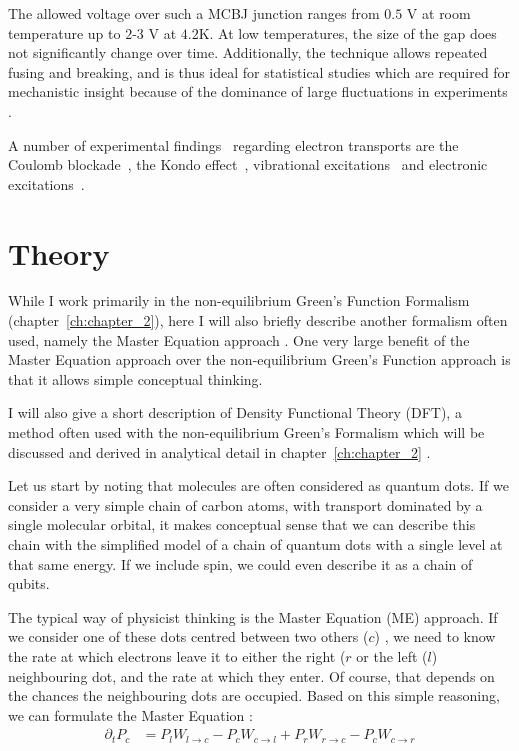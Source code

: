 The allowed voltage over such a MCBJ junction ranges from $0.5$ V at room temperature up to $2$-$3$ V at $4.2$K. At low temperatures, the size of the gap does not significantly change over time. Additionally, the technique allows repeated fusing and breaking, and is thus ideal for statistical studies which are required for mechanistic insight because of the dominance of large fluctuations in experiments \cite{ratnerrev2013}.

A number of experimental findings~\cite{koole} regarding electron transports are the Coulomb blockade~\cite{Park2000, Park2002}, the Kondo effect~\cite{Park2002}, vibrational excitations~\cite{vib1, vib2} and electronic excitations~\cite{elec1}.

\section{Theory}
While I work primarily in the non-equilibrium Green's Function Formalism (chapter~\ref{ch:chapter_2}), here I will also briefly describe another formalism often used, namely the Master Equation approach \cite{seldenthuis}. One very large benefit of the Master Equation approach over the non-equilibrium Green's Function approach is that it allows simple conceptual thinking.

I will also give a short description of Density Functional Theory (DFT), a method often used with the non-equilibrium Green's Formalism which will be discussed and derived in analytical detail in chapter~\ref{ch:chapter_2}  .

Let us start by noting that molecules are often considered as quantum dots. If we consider a very simple chain of carbon atoms, with transport dominated by a single molecular orbital, it makes conceptual sense that we can describe this chain with the simplified model of a chain of quantum dots with a single level at that same energy. If we include spin, we could even describe it as a chain of qubits.

The typical way of physicist thinking is the Master Equation (ME) approach. If we consider one of these dots centred between two others ($c$) , we need to know the rate at which electrons leave it to either the right ($r$ or the left ($l$) neighbouring dot, and the rate at which they enter. Of course, that depends on the chances the neighbouring dots are occupied. Based on this simple reasoning, we can formulate the Master Equation \cite{beenakker}:
\begin{align*}
\partial_t P_c &= P_l W_{l\rightarrow c} - P_c W_{c\rightarrow l} + P_r  W_{r\rightarrow c} - P_c W_{c\rightarrow r}
\end{align*}

